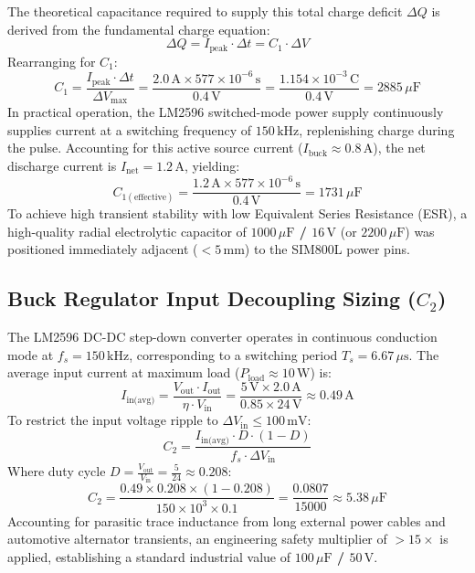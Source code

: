 \documentclass[12pt,a4paper,oneside]{report}
\begin{document}
The theoretical capacitance required to supply this total charge deficit $\Delta Q$ is derived from the fundamental charge equation:
\begin{equation}
\Delta Q = I_{\text{peak}} \cdot \Delta t = C_1 \cdot \Delta V
\end{equation}
Rearranging for $C_1$:
\begin{equation}
C_1 = \frac{I_{\text{peak}} \cdot \Delta t}{\Delta V_{\text{max}}} = \frac{2.0\,\text{A} \times 577 \times 10^{-6}\,\text{s}}{0.4\,\text{V}} = \frac{1.154 \times 10^{-3}\,\text{C}}{0.4\,\text{V}} = 2885\,\mu\text{F}
\label{eq:cap_math}
\end{equation}
In practical operation, the LM2596 switched-mode power supply continuously supplies current at a switching frequency of $150\,\text{kHz}$, replenishing charge during the pulse. Accounting for this active source current ($I_{\text{buck}} \approx 0.8\,\text{A}$), the net discharge current is $I_{\text{net}} = 1.2\,\text{A}$, yielding:
\begin{equation}
C_{1(\text{effective})} = \frac{1.2\,\text{A} \times 577 \times 10^{-6}\,\text{s}}{0.4\,\text{V}} = 1731\,\mu\text{F}
\end{equation}
To achieve high transient stability with low Equivalent Series Resistance (ESR), a high-quality radial electrolytic capacitor of \textbf{$1000\,\mu\text{F}$ / $16\,\text{V}$} (or $2200\,\mu\text{F}$) was positioned immediately adjacent ($< 5\,\text{mm}$) to the SIM800L power pins.

\subsection{\texorpdfstring{Buck Regulator Input Decoupling Sizing ($C_2$)}{Buck Regulator Input Decoupling Sizing (C2)}}
The LM2596 DC-DC step-down converter operates in continuous conduction mode at $f_s = 150\,\text{kHz}$, corresponding to a switching period $T_s = 6.67\,\mu\text{s}$. The average input current at maximum load ($P_{\text{load}} \approx 10\,\text{W}$) is:
\begin{equation}
I_{\text{in(avg)}} = \frac{V_{\text{out}} \cdot I_{\text{out}}}{\eta \cdot V_{\text{in}}} = \frac{5\,\text{V} \times 2.0\,\text{A}}{0.85 \times 24\,\text{V}} \approx 0.49\,\text{A}
\end{equation}
To restrict the input voltage ripple to $\Delta V_{\text{in}} \le 100\,\text{mV}$:
\begin{equation}
C_2 = \frac{I_{\text{in(avg)}} \cdot D \cdot (1 - D)}{f_s \cdot \Delta V_{\text{in}}}
\end{equation}
Where duty cycle $D = \frac{V_{\text{out}}}{V_{\text{in}}} = \frac{5}{24} \approx 0.208$:
\begin{equation}
C_2 = \frac{0.49 \times 0.208 \times (1 - 0.208)}{150 \times 10^3 \times 0.1} = \frac{0.0807}{15000} \approx 5.38\,\mu\text{F}
\end{equation}
Accounting for parasitic trace inductance from long external power cables and automotive alternator transients, an engineering safety multiplier of $> 15\times$ is applied, establishing a standard industrial value of \textbf{$100\,\mu\text{F}$ / $50\,\text{V}$}.
\end{document}
